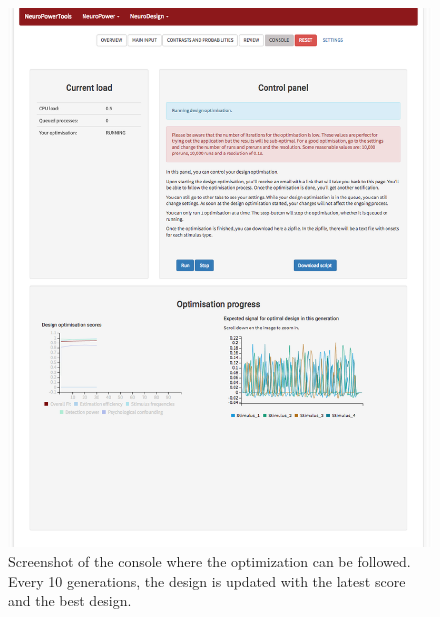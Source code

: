 \documentclass[article]{jss}
\begin{document}
%
\begin{figure}[t!]
\centering
\includegraphics{screenshot2.pdf}
\caption{Screenshot of the console where the optimization can be followed.  Every 10 generations, the design is updated with the latest score and the best design.\label{fig6}}
\end{figure}
%
\end{document}
